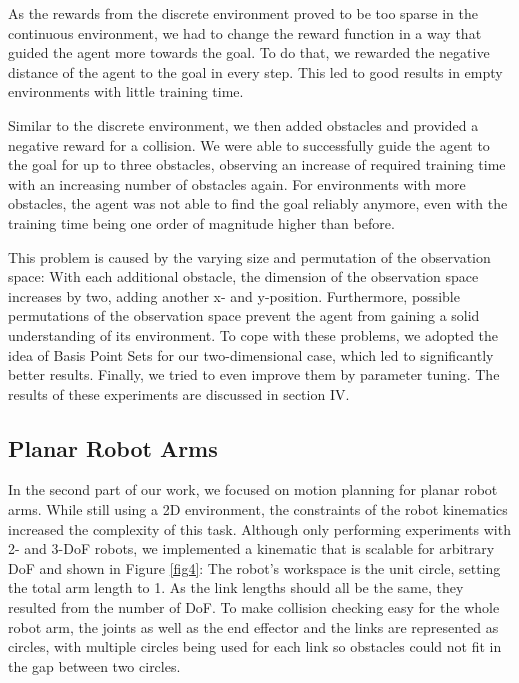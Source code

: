 \documentclass[conference]{IEEEtran}
\begin{document}
As the rewards from the discrete environment proved to be too sparse in the continuous environment, we had to change the reward function in a way that guided the agent more towards the goal. To do that, we rewarded the negative distance of the agent to the goal in every step. This led to good results in empty environments with little training time.

Similar to the discrete environment, we then added obstacles and provided a negative reward for a collision. We were able to successfully guide the agent to the goal for up to three obstacles, observing an increase of required training time with an increasing number of obstacles again. For environments with more obstacles, the agent was not able to find the goal reliably anymore, even with the training time being one order of magnitude higher than before.

This problem is caused by the varying size and permutation of the observation space: With each additional obstacle, the dimension of the observation space increases by two, adding another x- and y-position. Furthermore, possible permutations of the observation space prevent the agent from gaining a solid understanding of its environment. To cope with these problems, we adopted the idea of Basis Point Sets \cite{b2} for our two-dimensional case, which led to significantly better results. Finally, we tried to even improve them by parameter tuning. The results of these experiments are discussed in section IV.

\subsection{Planar Robot Arms}

In the second part of our work, we focused on motion planning for planar robot arms. While still using a 2D environment, the constraints of the robot kinematics increased the complexity of this task. Although only performing experiments with 2- and 3-DoF robots, we implemented a kinematic that is scalable for arbitrary DoF and shown in Figure \ref{fig4}: The robot's workspace is the unit circle, setting the total arm length to 1. As the link lengths should all be the same, they resulted from the number of DoF. To make collision checking easy for the whole robot arm, the joints as well as the end effector and the links are represented as circles, with multiple circles being used for each link so obstacles could not fit in the gap between two circles. 
\end{document}
